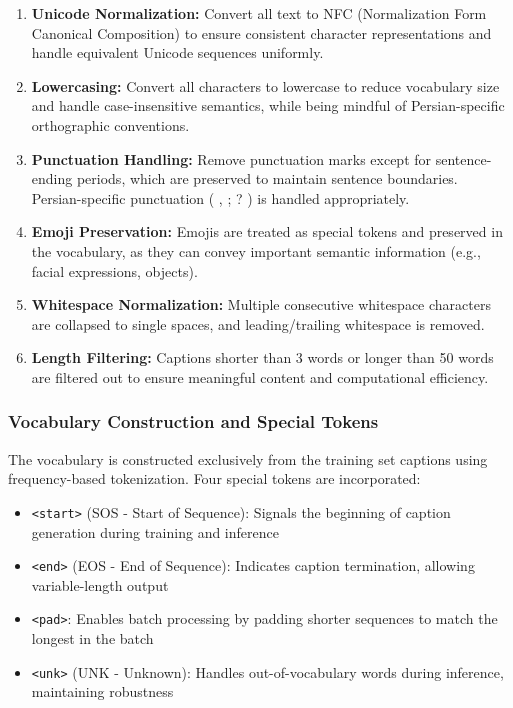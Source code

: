 \documentclass[conference]{IEEEtran}
\begin{document}
\begin{enumerate}[label=\arabic*.]
  \item \textbf{Unicode Normalization:} Convert all text to NFC (Normalization Form Canonical Composition) to ensure consistent character representations and handle equivalent Unicode sequences uniformly.

  \item \textbf{Lowercasing:} Convert all characters to lowercase to reduce vocabulary size and handle case-insensitive semantics, while being mindful of Persian-specific orthographic conventions.

  \item \textbf{Punctuation Handling:} Remove punctuation marks except for sentence-ending periods, which are preserved to maintain sentence boundaries. Persian-specific punctuation ( ,  ;  ? ) is handled appropriately.

  \item \textbf{Emoji Preservation:} Emojis are treated as special tokens and preserved in the vocabulary, as they can convey important semantic information (e.g., facial expressions, objects).

  \item \textbf{Whitespace Normalization:} Multiple consecutive whitespace characters are collapsed to single spaces, and leading/trailing whitespace is removed.

  \item \textbf{Length Filtering:} Captions shorter than 3 words or longer than 50 words are filtered out to ensure meaningful content and computational efficiency.
\end{enumerate}

\subsubsection{Vocabulary Construction and Special Tokens}
\label{sec:q1_vocabulary}

The vocabulary is constructed exclusively from the training set captions using frequency-based tokenization. Four special tokens are incorporated:

\begin{itemize}
  \item \texttt{<start>} (SOS - Start of Sequence): Signals the beginning of caption generation during training and inference
  \item \texttt{<end>} (EOS - End of Sequence): Indicates caption termination, allowing variable-length output
  \item \texttt{<pad>}: Enables batch processing by padding shorter sequences to match the longest in the batch
  \item \texttt{<unk>} (UNK - Unknown): Handles out-of-vocabulary words during inference, maintaining robustness
\end{itemize}
\end{document}
